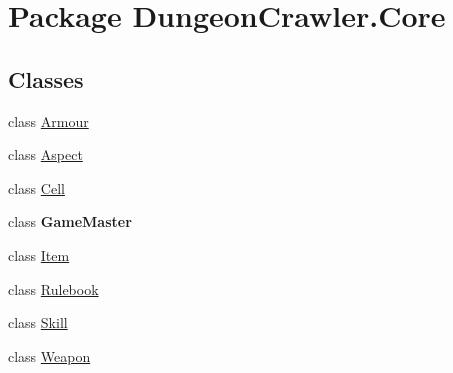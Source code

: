 \hypertarget{namespace_dungeon_crawler_1_1_core}{}\section{Package Dungeon\+Crawler.\+Core}
\label{namespace_dungeon_crawler_1_1_core}
\subsection*{Classes}
\begin{DoxyCompactItemize}
\item 
class \hyperlink{class_dungeon_crawler_1_1_core_1_1_armour}{Armour}
\item 
class \hyperlink{class_dungeon_crawler_1_1_core_1_1_aspect}{Aspect}
\item 
class \hyperlink{class_dungeon_crawler_1_1_core_1_1_cell}{Cell}
\item 
class {\bfseries Game\+Master}
\item 
class \hyperlink{class_dungeon_crawler_1_1_core_1_1_item}{Item}
\item 
class \hyperlink{class_dungeon_crawler_1_1_core_1_1_rulebook}{Rulebook}
\item 
class \hyperlink{class_dungeon_crawler_1_1_core_1_1_skill}{Skill}
\item 
class \hyperlink{class_dungeon_crawler_1_1_core_1_1_weapon}{Weapon}
\end{DoxyCompactItemize}
